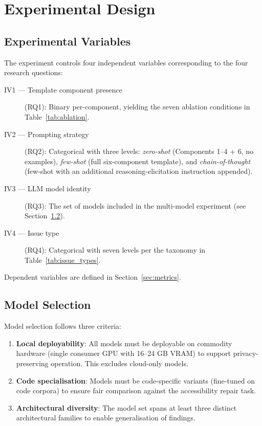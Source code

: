 \section{Experimental Design}
\label{sec:experimental_design}

\subsection{Experimental Variables}

The experiment controls four independent variables corresponding to the four
research questions:

\begin{description}
  \item[IV1 — Template component presence] (RQ1): Binary per-component,
    yielding the seven ablation conditions in Table~\ref{tab:ablation}.
  \item[IV2 — Prompting strategy] (RQ2): Categorical with three levels:
    \emph{zero-shot} (Components 1--4 + 6, no examples), \emph{few-shot}
    (full six-component template), and \emph{chain-of-thought} (few-shot
    with an additional reasoning-elicitation instruction appended).
  \item[IV3 — LLM model identity] (RQ3): The set of models included in the
    multi-model experiment (see Section~\ref{sec:model_selection}).
  \item[IV4 — Issue type] (RQ4): Categorical with seven levels per the
    taxonomy in Table~\ref{tab:issue_types}.
\end{description}

\noindent
Dependent variables are defined in Section~\ref{sec:metrics}.

\subsection{Model Selection}
\label{sec:model_selection}

Model selection follows three criteria:
\begin{enumerate}
  \item \textbf{Local deployability}: All models must be deployable on
    commodity hardware (single consumer GPU with 16--24 GB VRAM) to support
    privacy-preserving operation.  This excludes cloud-only models.
  \item \textbf{Code specialisation}: Models must be code-specific variants
    (fine-tuned on code corpora) to ensure fair comparison against the
    accessibility repair task.
  \item \textbf{Architectural diversity}: The model set spans at least three
    distinct architectural families to enable generalisation of findings.
\end{enumerate}

